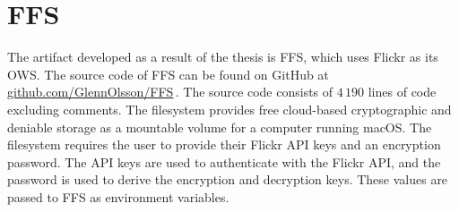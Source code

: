 \section{FFS}
\label{sec:res_ffs}
The artifact developed as a result of the thesis is \gls{FFS}, which uses Flickr as its \gls{OWS}. The source code of \gls{FFS} can be found on GitHub at \href{https://github.com/GlennOlsson/FFS}{github.com/GlennOlsson/FFS}\,\cite{olssonFejkFileSystem2022}. The source code consists of $4\,190$ lines of code excluding comments. The filesystem provides free \mbox{cloud-based} cryptographic and deniable storage as a mountable volume for a computer running macOS. The filesystem requires the user to provide their Flickr \gls{API} keys and an encryption password. The \gls{API} keys are used to authenticate with the Flickr \gls{API}, and the password is used to derive the encryption and decryption keys. These values are passed to \gls{FFS} as environment variables.
